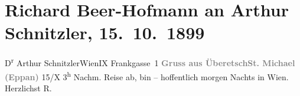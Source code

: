 

         \renewcommand{\erwaehnteOrte}{Orte: Bahnhof-Restauration Eppan Girlan, Eppan an der Weinstraße, Frankgasse, IX., Alsergrund, Sankt Michael, Wien, Überetsch}
         \renewcommand{\erwaehnteWerke}{}
               \section[Richard Beer-Hofmann an Arthur Schnitzler, 15. 10. 1899]{ Richard Beer-Hofmann an Arthur Schnitzler, 15. 10. 1899}\nopagebreak{}\rehead{ }\begin{ledgroupsized}[t]{13cm}\normalsize\beginnumbering \toendnotes[C]{\smallbreak\pagebreak[2]} 
\pstart{}{\pb}D\textsuperscript{r} Arthur Schnitzler\pend{}\pstart{}Wien\pend{}\pstart{}IX Frankgasse 1\pend{}{\bigskip}\pstart
           \noindent{}\centering{}\textcolor{gray}{\textbf{{\pb}Gruss aus
                  ÜberetschSt. Michael
                     (Eppan)}}\pend
           \pstart
           {\pb}15/X{ }3\textsuperscript{h} Nachm.\pend
           \pstart
           Reise ab, bin – hoffentlich morgen Nachts in Wien.\pend
           \pstart Herzlichst \spacefill\mbox{R.}\pend{}
         
         \endnumbering{}\end{ledgroupsized}  \newcommand{\dateiname}{L00991}\newcommand{\titel}{Richard Beer-Hofmann an Arthur Schnitzler, 15. 10. 1899}\newcommand{\editorInnen}{Martin Anton Müller und Gerd-Hermann Susen}
      